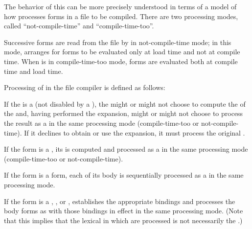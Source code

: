 The behavior of this  can be more precisely understood in
terms of a model of how  processes forms in
a file to be compiled. There are two processing modes, called
``not-compile-time'' and ``compile-time-too''.
 
Successive forms are read from the file by 
 in not-compile-time mode; in this mode, 
 arranges for forms to be evaluated only at load time
and not at compile time.  When  is in
compile-time-too mode, forms are evaluated both at compile time and
load time.


Processing of  in the file compiler is defined
as follows:

\beginlist
{}
  If the  is a 
(not disabled by a  ),
the  might or might not choose to compute
the  of the  and,
having performed the expansion, might or might not choose to process the result
as a  in the same processing mode
(compile-time-too or not-compile-time).
If it declines to obtain or use the expansion, it must process the original .
 
  If the form is a ,
its  is computed and processed as a 
 in
the same processing mode (compile-time-too or not-compile-time).
 
  If the form is a  form, each of its
body  is sequentially processed as a 
 in the same processing mode.
 
  If the form is a , 
, or , 
 establishes the appropriate bindings and processes the
body forms as  with those bindings in effect
in the same processing mode.  (Note that this implies that the lexical
 in which  are processed
is not necessarily the .)
 
